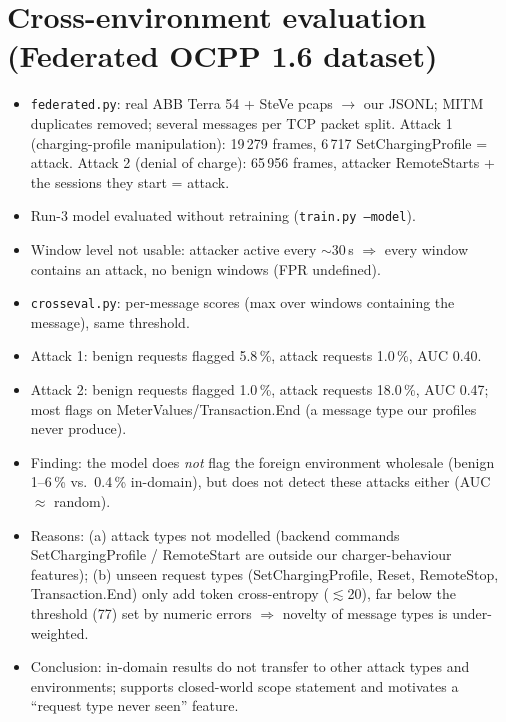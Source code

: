 \documentclass[11pt]{article}
\begin{document}
\section{Cross-environment evaluation (Federated OCPP 1.6 dataset)}
\begin{itemize}
  \item \texttt{federated.py}: real ABB Terra 54 + SteVe pcaps $\to$ our JSONL; MITM duplicates removed; several messages per TCP packet split. Attack 1 (charging-profile manipulation): 19\,279 frames, 6\,717 SetChargingProfile = attack. Attack 2 (denial of charge): 65\,956 frames, attacker RemoteStarts + the sessions they start = attack.
  \item Run-3 model evaluated without retraining (\texttt{train.py --model}).
  \item Window level not usable: attacker active every $\sim$30\,s $\Rightarrow$ every window contains an attack, no benign windows (FPR undefined).
  \item \texttt{crosseval.py}: per-message scores (max over windows containing the message), same threshold.
  \item Attack 1: benign requests flagged 5.8\,\%, attack requests 1.0\,\%, AUC 0.40.
  \item Attack 2: benign requests flagged 1.0\,\%, attack requests 18.0\,\%, AUC 0.47; most flags on MeterValues/Transaction.End (a message type our profiles never produce).
  \item Finding: the model does \emph{not} flag the foreign environment wholesale (benign 1--6\,\% vs.\ 0.4\,\% in-domain), but does not detect these attacks either (AUC $\approx$ random).
  \item Reasons: (a) attack types not modelled (backend commands SetChargingProfile / RemoteStart are outside our charger-behaviour features); (b) unseen request types (SetChargingProfile, Reset, RemoteStop, Transaction.End) only add token cross-entropy ($\lesssim$20), far below the threshold (77) set by numeric errors $\Rightarrow$ novelty of message types is under-weighted.
  \item Conclusion: in-domain results do not transfer to other attack types and environments; supports closed-world scope statement and motivates a ``request type never seen'' feature.
\end{itemize}
\end{document}

